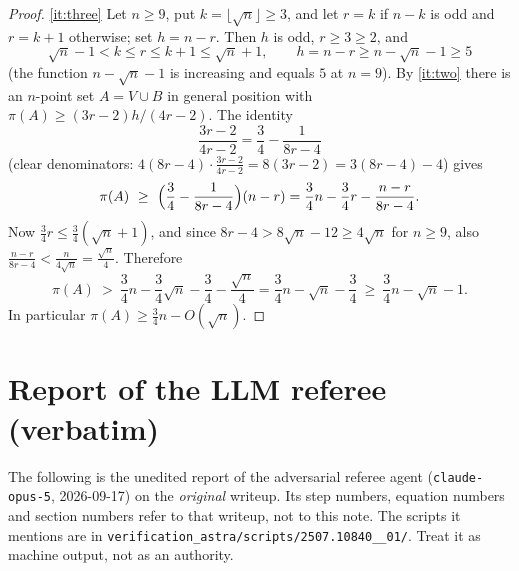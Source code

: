 \documentclass[11pt,a4paper]{article}
\theoremstyle{plain}
\theoremstyle{definition}
\theoremstyle{remark}
\newcommand{\pipath}{\pi}
\begin{document}
\begin{proof}
\ref{it:three} Let $n\ge9$, put $k=\lfloor\sqrt n\rfloor\ge3$, and let $r=k$ if $n-k$ is odd and $r=k+1$ otherwise; set $h=n-r$. Then $h$ is odd, $r\ge3\ge2$, and
\[
 \sqrt n-1<k\le r\le k+1\le\sqrt n+1,\qquad h=n-r\ge n-\sqrt n-1\ge5
\]
(the function $n-\sqrt n-1$ is increasing and equals $5$ at $n=9$). By \ref{it:two} there is an $n$-point set $A=V\cup B$ in general position with $\pipath(A)\ge(3r-2)h/(4r-2)$. The identity
\[
 \frac{3r-2}{4r-2}=\frac34-\frac{1}{8r-4}
\]
(clear denominators: $4(8r-4)\cdot\frac{3r-2}{4r-2}=8(3r-2)=3(8r-4)-4$) gives
\[
 \pipath(A)\ \ge\ \Bigl(\frac34-\frac1{8r-4}\Bigr)(n-r)
 =\frac34n-\frac34r-\frac{n-r}{8r-4}.
\]
Now $\tfrac34r\le\tfrac34(\sqrt n+1)$, and since $8r-4>8\sqrt n-12\ge4\sqrt n$ for $n\ge9$, also $\frac{n-r}{8r-4}<\frac{n}{4\sqrt n}=\frac{\sqrt n}4$. Therefore
\[
 \pipath(A)\ >\ \frac34n-\frac34\sqrt n-\frac34-\frac{\sqrt n}4=\frac34n-\sqrt n-\frac34\ \ge\ \frac34n-\sqrt n-1 .
\]
In particular $\pipath(A)\ge\tfrac34n-O(\sqrt n)$.
\end{proof}

\section{Report of the LLM referee (verbatim)}\label{app:referee}

\begin{tcolorbox}[colback=gray!8,colframe=gray!50,boxrule=0.4pt,arc=2pt]
\small The following is the unedited report of the adversarial referee agent (\texttt{claude-opus-5}, 2026-09-17) on the \emph{original} writeup. Its step numbers, equation numbers and section numbers refer to that writeup, not to this note. The scripts it mentions are in \texttt{verification\_astra/scripts/2507.10840\_\_01/}. Treat it as machine output, not as an authority.
\end{tcolorbox}


\end{document}
